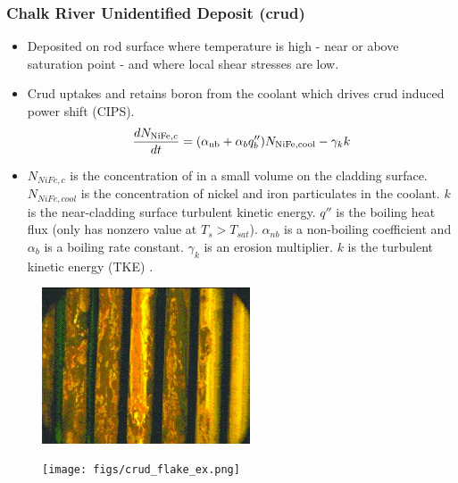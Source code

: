 \documentclass[t, pdftex]{beamer}
\begin{document}
\begin{frame}
\frametitle{Chalk River Unidentified Deposit (crud)}
\vspace{-12pt}
\begin{scriptsize}
    \begin{itemize}
        \item Deposited on rod surface where temperature is high - near or above saturation point - and where local shear stresses are low.
        \item Crud uptakes and retains boron from the coolant which drives
        crud induced power shift (CIPS).       
        \[
        \frac{d N_{\mathrm{\ce{NiFe}},c}}{dt} = (\alpha_{\mathrm{nb}} + \alpha_{b}q''_{b} )N_{\mathrm{\ce{NiFe}}, \mathrm{cool}} - \gamma_k k
        \]
        \item $N_{NiFe,c}$ is the concentration of  in a small volume on the cladding surface. $N_{NiFe,cool}$ is the concentration of nickel and iron particulates in the coolant.  $k$ is the near-cladding surface turbulent kinetic energy.  $q''$ is the boiling heat flux (only has nonzero value at $T_s>T_{sat}$).  $\alpha_{nb}$ is a non-boiling coefficient and $\alpha_b$ is a boiling rate constant.  $\gamma_k$ is an erosion multiplier. $k$ is the turbulent kinetic energy (TKE) \cite{mongoose17}.
        
    \end{itemize}
\end{scriptsize}

\vspace{-12pt}
\begin{figure}
    \centering
    \begin{minipage}{.5\textwidth}
        \centering
        \includegraphics[width=0.55\textwidth]{figs/crud-crud.jpg}
    \end{minipage}%
    \begin{minipage}{.5\textwidth}
        \centering
        \texttt{[image: figs/crud\_flake\_ex.png]}
    \end{minipage}
\end{figure}
\end{frame}
\end{document}
